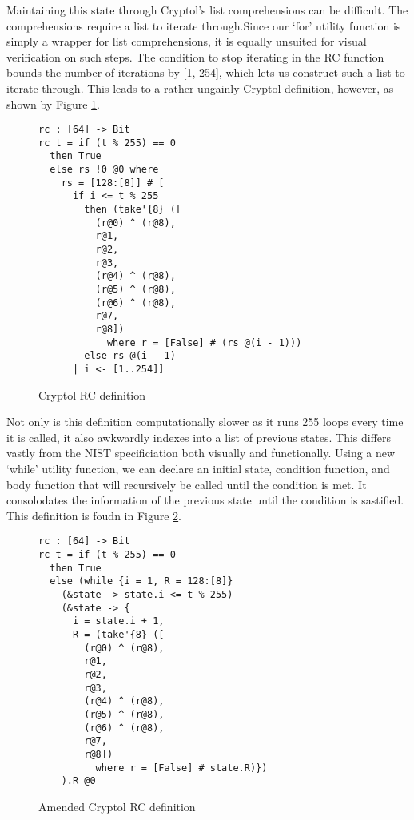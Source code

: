 Maintaining this state through Cryptol's list comprehensions can be difficult.
The comprehensions require a list to iterate through.Since our ‘for’ utility 
function is simply a wrapper for list comprehensions, it is equally unsuited for 
visual verification on such steps. The condition to stop iterating in the RC function
bounds the number of iterations by [1, 254], which lets us construct such a list to 
iterate through. This leads to a rather ungainly Cryptol definition, however, as 
shown by Figure \ref{fig:cryptolRC}.

\begin{figure}[h]
  \centering
\begin{lstlisting}[language=Cryptol]
rc : [64] -> Bit
rc t = if (t % 255) == 0 
  then True 
  else rs !0 @0 where
    rs = [128:[8]] # [
      if i <= t % 255
        then (take'{8} ([
          (r@0) ^ (r@8),
          r@1,
          r@2,
          r@3, 
          (r@4) ^ (r@8),
          (r@5) ^ (r@8),
          (r@6) ^ (r@8),
          r@7,
          r@8])
            where r = [False] # (rs @(i - 1)))
        else rs @(i - 1)
      | i <- [1..254]]
\end{lstlisting}
\caption{Cryptol RC definition}
\label{fig:cryptolRC}
\end{figure}

Not only is this definition computationally slower as it runs 255 loops every time it is called, 
it also awkwardly indexes into a list of previous states. This differs vastly from the 
NIST specificiation both visually and functionally. Using a new ‘while’ utility function, we 
can declare an initial state, condition function, and body function that will recursively 
be called until the condition is met. It consolodates the information of the previous state 
until the condition is sastified. This definition is foudn in Figure \ref{fig:cryptolamendedRC}.

\begin{figure}[h]
  \centering
\begin{lstlisting}[language=Cryptol]
rc : [64] -> Bit
rc t = if (t % 255) == 0 
  then True 
  else (while {i = 1, R = 128:[8]}
    (&state -> state.i <= t % 255)
    (&state -> {
      i = state.i + 1, 
      R = (take'{8} ([
        (r@0) ^ (r@8),
        r@1,
        r@2,
        r@3,
        (r@4) ^ (r@8),
        (r@5) ^ (r@8),
        (r@6) ^ (r@8),
        r@7, 
        r@8]) 
          where r = [False] # state.R)})
    ).R @0
\end{lstlisting}
\caption{Amended Cryptol RC definition}
\label{fig:cryptolamendedRC}
\end{figure}

